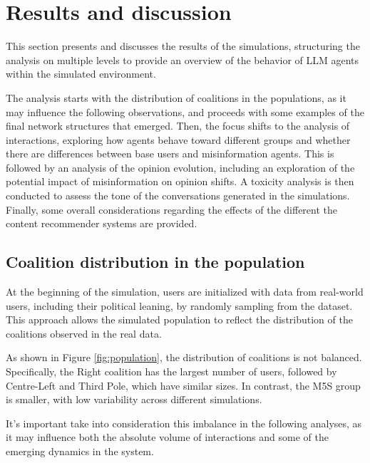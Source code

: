 \section{Results and discussion}
\label{sec:discussion}

This section presents and discusses the results of the simulations, structuring the analysis on multiple levels to provide an overview of the behavior of LLM agents within the simulated environment.

The analysis starts with the distribution of coalitions in the populations, as it may influence the following observations, and proceeds with some examples of the final network structures that emerged.
Then, the focus shifts to the analysis of interactions, exploring how agents behave toward different groups and whether there are differences between base users and misinformation agents.
This is followed by an analysis of the opinion evolution, including an exploration of the potential impact of misinformation on opinion shifts.
A toxicity analysis is then conducted to assess the tone of the conversations generated in the simulations.
Finally, some overall considerations regarding the effects of the different the content recommender systems are provided.


\subsection{Coalition distribution in the population}
At the beginning of the simulation, users are initialized with data from real-world users, including their political leaning, by randomly sampling from the dataset.
This approach allows the simulated population to reflect the distribution of the coalitions observed in the real data.

As shown in Figure \ref{fig:population}, the distribution of coalitions is not balanced.
Specifically, the Right coalition has the largest number of users, followed by Centre-Left and Third Pole, which have similar sizes.
In contrast, the M5S group is smaller, with low variability across different simulations.

It's important take into consideration this imbalance in the following analyses, as it may influence both the absolute volume of interactions and some of the emerging dynamics in the system.


